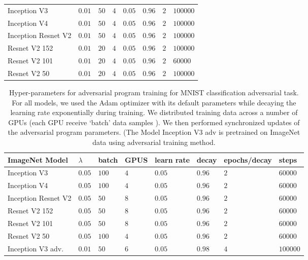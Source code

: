 \documentclass{article}
\begin{document}
\begin{table}
\begin{tabular}{llllllll}
     \midrule
    Inception V3                 & $0.01$ & $50$  & $4$  &  $0.05$ & $0.96$ & $2$ & $100000$  \\
    Inception V4                & $0.01$ & $50$  & $4$  &  $0.05$ & $0.96$ & $2$ & $100000$  \\
    Inception Resnet V2    & $0.01$ & $50$  & $4$  &  $0.05$ & $0.96$ & $2$ & $100000$  \\
    Resnet V2 152            & $0.01$ & $20$  & $4$  &  $0.05$ & $0.96$ & $2$ & $100000$  \\
    Resnet V2 101           & $0.01$ & $20$  & $4$  &  $0.05$ & $0.96$ & $2$ & $60000$  \\
    Resnet V2 50           & $0.01$ & $20$  & $4$  &  $0.05$ & $0.96$ & $2$ & $100000$  \\
    \bottomrule
  \end{tabular}
\end{table}\begin{table}
  \caption{Hyper-parameters for adversarial program training for MNIST classification adversarial task. For all models, we used the Adam optimizer with its default parameters while decaying the learning rate exponentially during training.  We distributed training data across a number of GPUs (each GPU receive `batch' data samples ). We then performed synchronized updates of the adversarial program parameters. (The Model Inception V3 adv is pretrained on ImageNet data using adversarial training method.}
  \label{table: hyperparams mnist}
  \centering
  \begin{tabular}{llllllll}
    \toprule
     ImageNet Model &  $\lambda$ & batch & GPUS & learn rate & decay & epochs/decay & steps \\
     \midrule
    Inception V3                 & $0.05$ & $100$  & $4$  &  $0.05$ & $0.96$ & $2$ & $60000$  \\
    Inception V4                & $0.05$ & $100$  & $4$  &  $0.05$ & $0.96$ & $2$ & $60000$  \\
    Inception Resnet V2    & $0.05$ & $50$  & $8$  &  $0.05$ & $0.96$ & $2$ & $60000$  \\
    Resnet V2 152            & $0.05$ & $50$  & $8$  &  $0.05$ & $0.96$ & $2$ & $60000$  \\
    Resnet V2 101           & $0.05$ & $50$  & $8$  &  $0.05$ & $0.96$ & $2$ & $60000$  \\
    Resnet V2 50           & $0.05$ & $100$  & $4$  &  $0.05$ & $0.96$ & $2$ & $60000$  \\
    Inception V3 adv.        & $0.01$ & $50$  & $6$  &  $0.05$ & $0.98$ & $4$ & $100000$  \\

\end{tabular}
\end{table}
\end{document}
